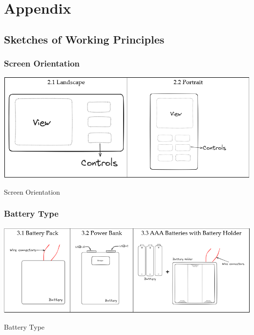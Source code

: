 \chapter{Appendix}
\label{ch:appendix}

\section{Sketches of Working Principles}
\label{appendix:sketches-of-working-principles}


\subsection{Screen Orientation}
\begin{table}[H]
    \centering
    \includegraphics[width=\linewidth]{texs/Part1/chapter3/image/s2.png}
    \caption{Screen Orientation}
    \label{tab:screen-orientation}
\end{table}

\subsection{Battery Type}
\begin{table}[H]
    \centering
    \includegraphics[width=\linewidth]{texs/Part1/chapter3/image/s3.png}
    \caption{Battery Type}
    \label{tab:battery-type}
\end{table}

